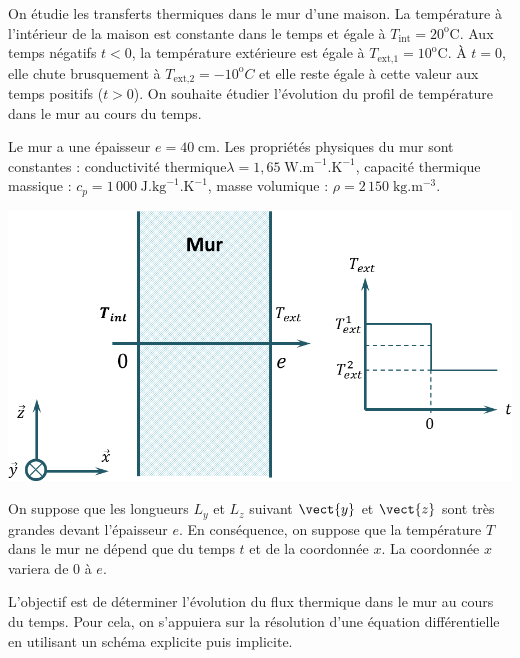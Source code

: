 \noindent \begin{minipage}[c]{.5\linewidth}
On étudie les transferts thermiques dans le mur d’une maison. La température à
l'intérieur de la maison est constante dans le temps et égale à $T_{\text{int}}=20^{\text{o}} \text{C}$. Aux temps 
négatifs $t<0$, la température extérieure est égale à $T_{\text{ext,1}}=10^{\text{o}} \text{C}$. À $t=0$, elle chute 
brusquement à $T_{\text{ext,2}}=-10^{\text{o}} C$ et elle reste égale à cette valeur aux temps positifs ($t>0$). On
souhaite étudier l'évolution du profil de température dans le mur au cours du temps.

Le mur a une épaisseur $e=40\;\text{cm}$. Les propriétés physiques du mur sont constantes : conductivité 
thermique$\lambda = 1,65\; \text{W.m}^{-1}.\text{K}^{-1}$, capacité thermique massique : $c_p = 1\, 000\; 
\text{J}.\text{kg}^{-1}.\text{K}^{-1}$, masse volumique : $\rho = 2\, 150 \; \text{kg}.\text{m}^{-3}$. 

\end{minipage} \hfill
\begin{minipage}[c]{.5\linewidth}
\begin{center}
\includegraphics[width=\linewidth]{images/figure_01}
\end{center}
\end{minipage}

\noindent
On suppose que les longueurs $L_y$ et $L_z$ suivant $\vect{y}$ et $\vect{z}$ sont très grandes devant l'épaisseur $e$. 
En conséquence, on suppose que la température $T$ dans le mur ne dépend que du temps $t$ et de la coordonnée $x$. La 
coordonnée $x$ variera de 0 à $e$.

\begin{obj}
L'objectif est de déterminer l'évolution du flux thermique dans le mur au cours du temps. Pour cela, on s'appuiera sur 
la résolution d'une équation différentielle en utilisant un schéma explicite puis implicite.
\end{obj}
\fi

